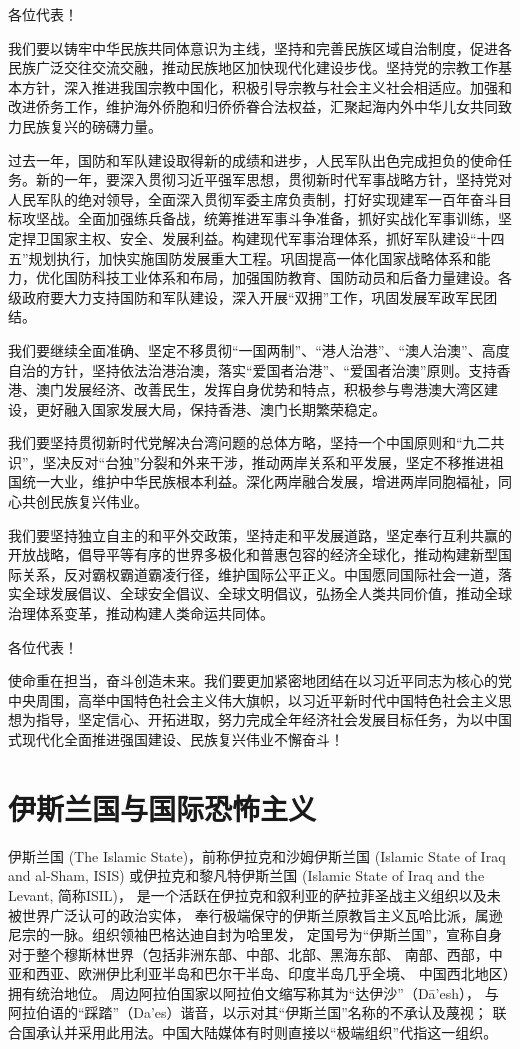 \documentclass[10pt, UTF8]{ctexbook} %
\begin{document}
各位代表！

我们要以铸牢中华民族共同体意识为主线，坚持和完善民族区域自治制度，促进各民族广泛交往交流交融，推动民族地区加快现代化建设步伐。坚持党的宗教工作基本方针，深入推进我国宗教中国化，积极引导宗教与社会主义社会相适应。加强和改进侨务工作，维护海外侨胞和归侨侨眷合法权益，汇聚起海内外中华儿女共同致力民族复兴的磅礴力量。

过去一年，国防和军队建设取得新的成绩和进步，人民军队出色完成担负的使命任务。新的一年，要深入贯彻习近平强军思想，贯彻新时代军事战略方针，坚持党对人民军队的绝对领导，全面深入贯彻军委主席负责制，打好实现建军一百年奋斗目标攻坚战。全面加强练兵备战，统筹推进军事斗争准备，抓好实战化军事训练，坚定捍卫国家主权、安全、发展利益。构建现代军事治理体系，抓好军队建设“十四五”规划执行，加快实施国防发展重大工程。巩固提高一体化国家战略体系和能力，优化国防科技工业体系和布局，加强国防教育、国防动员和后备力量建设。各级政府要大力支持国防和军队建设，深入开展“双拥”工作，巩固发展军政军民团结。

我们要继续全面准确、坚定不移贯彻“一国两制”、“港人治港”、“澳人治澳”、高度自治的方针，坚持依法治港治澳，落实“爱国者治港”、“爱国者治澳”原则。支持香港、澳门发展经济、改善民生，发挥自身优势和特点，积极参与粤港澳大湾区建设，更好融入国家发展大局，保持香港、澳门长期繁荣稳定。

我们要坚持贯彻新时代党解决台湾问题的总体方略，坚持一个中国原则和“九二共识”，坚决反对“台独”分裂和外来干涉，推动两岸关系和平发展，坚定不移推进祖国统一大业，维护中华民族根本利益。深化两岸融合发展，增进两岸同胞福祉，同心共创民族复兴伟业。

我们要坚持独立自主的和平外交政策，坚持走和平发展道路，坚定奉行互利共赢的开放战略，倡导平等有序的世界多极化和普惠包容的经济全球化，推动构建新型国际关系，反对霸权霸道霸凌行径，维护国际公平正义。中国愿同国际社会一道，落实全球发展倡议、全球安全倡议、全球文明倡议，弘扬全人类共同价值，推动全球治理体系变革，推动构建人类命运共同体。

各位代表！

使命重在担当，奋斗创造未来。我们要更加紧密地团结在以习近平同志为核心的党中央周围，高举中国特色社会主义伟大旗帜，以习近平新时代中国特色社会主义思想为指导，坚定信心、开拓进取，努力完成全年经济社会发展目标任务，为以中国式现代化全面推进强国建设、民族复兴伟业不懈奋斗！

\chapter{伊斯兰国与国际恐怖主义}

伊斯兰国 (The Islamic State)，前称伊拉克和沙姆伊斯兰国
(Islamic State of Iraq and al-Sham, ISIS) 或伊拉克和黎凡特伊斯兰国
(Islamic State of Iraq and the Levant, 简称ISIL)，
是一个活跃在伊拉克和叙利亚的萨拉菲圣战主义组织以及未被世界广泛认可的政治实体，
奉行极端保守的伊斯兰原教旨主义瓦哈比派，属逊尼宗的一脉。组织领袖巴格达迪自封为哈里发，
定国号为“伊斯兰国”，宣称自身对于整个穆斯林世界（包括非洲东部、中部、北部、黑海东部、
南部、西部，中亚和西亚、欧洲伊比利亚半岛和巴尔干半岛、印度半岛几乎全境、
中国西北地区）拥有统治地位。
周边阿拉伯国家以阿拉伯文缩写称其为“达伊沙”（Dā'esh），
与阿拉伯语的“踩踏”（Da'es）谐音，以示对其“伊斯兰国”名称的不承认及蔑视；
联合国承认并采用此用法。中国大陆媒体有时则直接以“极端组织”代指这一组织。
\end{document}
